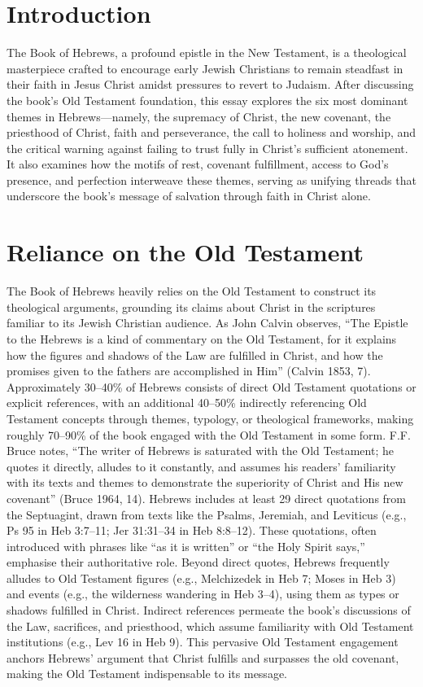 \documentclass[12pt]{article}
\begin{document}
\section{Introduction}
The Book of Hebrews, a profound epistle in the New Testament, is a theological
masterpiece crafted to encourage early Jewish Christians to remain steadfast in
their faith in Jesus Christ amidst pressures to revert to Judaism. After
discussing the book’s Old Testament foundation, this essay explores the six
most dominant themes in Hebrews---namely, the supremacy of Christ, the new
covenant, the priesthood of Christ, faith and perseverance, the call to
holiness and worship, and the critical warning against failing to trust fully
in Christ’s sufficient atonement. It also examines how the motifs of rest,
covenant fulfillment, access to God’s presence, and perfection interweave these
themes, serving as unifying threads that underscore the book’s message of
salvation through faith in Christ alone.

\section{Reliance on the Old Testament}
The Book of Hebrews heavily relies on the Old Testament to construct its
theological arguments, grounding its claims about Christ in the scriptures
familiar to its Jewish Christian audience. As John Calvin observes, ``The
Epistle to the Hebrews is a kind of commentary on the Old Testament, for it
explains how the figures and shadows of the Law are fulfilled in Christ, and
how the promises given to the fathers are accomplished in Him'' (Calvin 1853,
7). Approximately 30--40\% of Hebrews consists of direct Old Testament
quotations or explicit references, with an additional 40--50\% indirectly
referencing Old Testament concepts through themes, typology, or theological
frameworks, making roughly 70--90\% of the book engaged with the Old Testament
in some form. F.F. Bruce notes, ``The writer of Hebrews is saturated with the
Old Testament; he quotes it directly, alludes to it constantly, and assumes his
readers’ familiarity with its texts and themes to demonstrate the superiority
of Christ and His new covenant'' (Bruce 1964, 14). Hebrews includes at least 29
direct quotations from the Septuagint, drawn from texts like the Psalms,
Jeremiah, and Leviticus (e.g., Ps 95 in Heb 3:7--11; Jer 31:31--34 in Heb
8:8--12). These quotations, often introduced with phrases like ``as it is
written'' or ``the Holy Spirit says,'' emphasise their authoritative role.
Beyond direct quotes, Hebrews frequently alludes to Old Testament figures
(e.g., Melchizedek in Heb 7; Moses in Heb 3) and events (e.g., the wilderness
wandering in Heb 3--4), using them as types or shadows fulfilled in Christ.
Indirect references permeate the book’s discussions of the Law, sacrifices, and
priesthood, which assume familiarity with Old Testament institutions (e.g., Lev
16 in Heb 9). This pervasive Old Testament engagement anchors Hebrews’ argument
that Christ fulfills and surpasses the old covenant, making the Old Testament
indispensable to its message.
\end{document}
